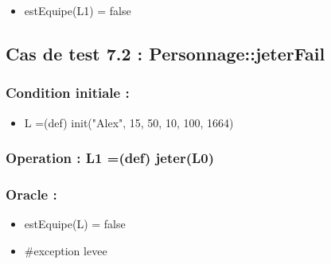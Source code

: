 \documentclass[11pt]{article}
\begin{document}
\begin{itemize}

\item estEquipe(L1) = false\\
\label{sec-1.17.3.1}


\end{itemize} %
\subsection{Cas de test 7.2 : Personnage::jeterFail}
\label{sec-1.18}

\subsubsection{Condition initiale :}
\label{sec-1.18.1}

\begin{itemize}

\item L =(def) init("Alex", 15, 50, 10, 100, 1664)\\
\label{sec-1.18.1.1}

\end{itemize} %
\subsubsection{Operation : L1 =(def) jeter(L0)}
\label{sec-1.18.2}

\subsubsection{Oracle :}
\label{sec-1.18.3}

\begin{itemize}

\item estEquipe(L) = false\\
\label{sec-1.18.3.1}


\item \#exception levee\\
\label{sec-1.18.3.2}


\end{itemize} %
\end{document}
